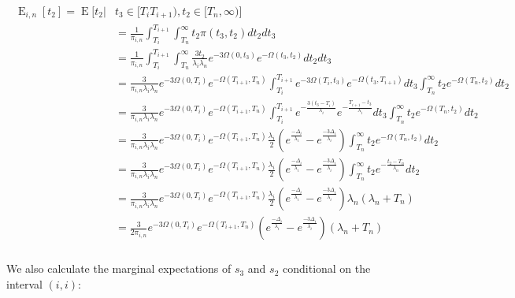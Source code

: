 \documentclass{article}
\DeclareMathOperator{\E}{E}
\begin{document}
\begin{align}
    \begin{split}
        \E_{i,n}[t_2] = \E\big[t_2|&t_3 \in [T_i T_{i+1}),t_2 \in [T_n,\infty) \big]\\
        &= \frac{1}{\pi_{i,n}}\int_{T_i}^{T_{i+1}}\int_{T_n}^{\infty}t_2\pi(t_3,t_2)dt_2dt_3\\
        &= \frac{1}{\pi_{i,n}}\int_{T_i}^{T_{i+1}}\int_{T_n}^{\infty}
            \frac{3t_2}{\lambda_i \lambda_n}e^{-3\Omega(0,t_3)}e^{-\Omega(t_3,t_2)}dt_2dt_3\\
        &= \frac{3}{\pi_{i,n}\lambda_i\lambda_n}e^{-3\Omega(0,T_i)}e^{-\Omega(T_{i+1},T_n)}
            \int_{T_i}^{T_{i+1}}e^{-3\Omega(T_i,t_3)}e^{-\Omega(t_3,T_{i+1})}dt_3
            \int_{T_n}^{\infty}t_2e^{-\Omega(T_n,t_2)}dt_2\\
        &= \frac{3}{\pi_{i,n}\lambda_i\lambda_n}e^{-3\Omega(0,T_i)}e^{-\Omega(T_{i+1},T_n)}
            \int_{T_i}^{T_{i+1}}e^{-\frac{3(t_3-T_i)}{\lambda_i}}e^{-\frac{T_{i+1}-t_3}{\lambda_i}}dt_3
            \int_{T_n}^{\infty}t_2e^{-\Omega(T_n,t_2)}dt_2\\
        &= \frac{3}{\pi_{i,n}\lambda_i\lambda_n}e^{-3\Omega(0,T_i)}e^{-\Omega(T_{i+1},T_n)}
            \frac{\lambda_i}{2} \left(e^{\frac{-\Delta_i}{\lambda_i}}-e^{\frac{-3\Delta_i}{\lambda_i}}\right)
            \int_{T_n}^{\infty}t_2e^{-\Omega(T_n,t_2)}dt_2\\
        &= \frac{3}{\pi_{i,n}\lambda_i\lambda_n}e^{-3\Omega(0,T_i)}e^{-\Omega(T_{i+1},T_n)}
            \frac{\lambda_i}{2} \left(e^{\frac{-\Delta_i}{\lambda_i}}-e^{\frac{-3\Delta_i}{\lambda_i}}\right)
            \int_{T_n}^{\infty}t_2e^{-\frac{t_2-T_n}{\lambda_n}}dt_2\\
        &= \frac{3}{\pi_{i,n}\lambda_i\lambda_n}e^{-3\Omega(0,T_i)}e^{-\Omega(T_{i+1},T_n)}
            \frac{\lambda_i}{2} \left(e^{\frac{-\Delta_i}{\lambda_i}}-e^{\frac{-3\Delta_i}{\lambda_i}}\right)
            \lambda_n\left(\lambda_n+T_n\right)\\
        &= \frac{3}{2\pi_{i,n}}e^{-3\Omega(0,T_i)}e^{-\Omega(T_{i+1},T_n)}
             \left(e^{\frac{-\Delta_i}{\lambda_i}}-e^{\frac{-3\Delta_i}{\lambda_i}}\right)
            \left(\lambda_n+T_n\right)\\
    \end{split}
    \label{eq:Et2}
\end{align}

We also calculate the marginal expectations of $s_3$ and $s_2$ conditional on
the interval $(i,i)$:
\end{document}
